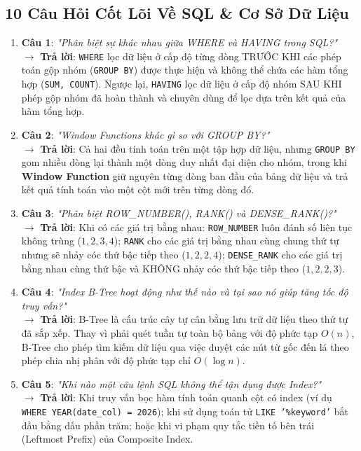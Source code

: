 \subsection{10 Câu Hỏi Cốt Lõi Về SQL \& Cơ Sở Dữ Liệu}
\begin{enumerate}
    \item \textbf{Câu 1}: \textit{"Phân biệt sự khác nhau giữa WHERE và HAVING trong SQL?"} \\
    $\rightarrow$ \textbf{Trả lời}: \texttt{WHERE} lọc dữ liệu ở cấp độ từng dòng TRƯỚC KHI các phép toán gộp nhóm (\texttt{GROUP BY}) được thực hiện và không thể chứa các hàm tổng hợp (\texttt{SUM, COUNT}). Ngược lại, \texttt{HAVING} lọc dữ liệu ở cấp độ nhóm SAU KHI phép gộp nhóm đã hoàn thành và chuyên dùng để lọc dựa trên kết quả của hàm tổng hợp.
    \item \textbf{Câu 2}: \textit{"Window Functions khác gì so với GROUP BY?"} \\
    $\rightarrow$ \textbf{Trả lời}: Cả hai đều tính toán trên một tập hợp dữ liệu, nhưng \texttt{GROUP BY} gom nhiều dòng lại thành một dòng duy nhất đại diện cho nhóm, trong khi \textbf{Window Function} giữ nguyên từng dòng ban đầu của bảng dữ liệu và trả kết quả tính toán vào một cột mới trên từng dòng đó.
    \item \textbf{Câu 3}: \textit{"Phân biệt ROW\_NUMBER(), RANK() và DENSE\_RANK()?"} \\
    $\rightarrow$ \textbf{Trả lời}: Khi có các giá trị bằng nhau: \texttt{ROW\_NUMBER} luôn đánh số liên tục không trùng ($1, 2, 3, 4$); \texttt{RANK} cho các giá trị bằng nhau cùng chung thứ tự nhưng sẽ nhảy cóc thứ bậc tiếp theo ($1, 2, 2, 4$); \texttt{DENSE\_RANK} cho các giá trị bằng nhau cùng thứ bậc và KHÔNG nhảy cóc thứ bậc tiếp theo ($1, 2, 2, 3$).
    \item \textbf{Câu 4}: \textit{"Index B-Tree hoạt động như thế nào và tại sao nó giúp tăng tốc độ truy vấn?"} \\
    $\rightarrow$ \textbf{Trả lời}: B-Tree là cấu trúc cây tự cân bằng lưu trữ dữ liệu theo thứ tự đã sắp xếp. Thay vì phải quét tuần tự toàn bộ bảng với độ phức tạp $O(n)$, B-Tree cho phép tìm kiếm dữ liệu qua việc duyệt các nút từ gốc đến lá theo phép chia nhị phân với độ phức tạp chỉ $O(\log n)$.
    \item \textbf{Câu 5}: \textit{"Khi nào một câu lệnh SQL không thể tận dụng được Index?"} \\
    $\rightarrow$ \textbf{Trả lời}: Khi truy vấn bọc hàm tính toán quanh cột có index (ví dụ \texttt{WHERE YEAR(date\_col) = 2026}); khi sử dụng toán tử \texttt{LIKE '\%keyword'} bắt đầu bằng dấu phần trăm; hoặc khi vi phạm quy tắc tiền tố bên trái (Leftmost Prefix) của Composite Index.

\end{enumerate}
